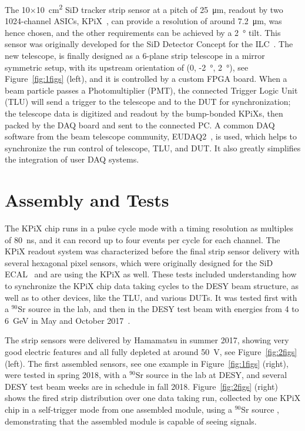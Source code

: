 The 10$\times$\SI{10}{\square\centi\metre} SiD tracker strip sensor at a pitch of \SI{25}{\micro\metre}, readout by two 1024-channel ASICs, KPiX~\cite{kpix}, can provide a resolution of around \SI{7.2}{\micro\metre},
was hence chosen, and the other requirements can be achieved by a \SI{2}{\degree} tilt. This sensor was originally developed for the SiD Detector Concept for the ILC~\cite{Behnke:2013lya}.
The new telescope, \lycoris is finally designed as a 6-plane strip telescope in a mirror symmetric setup, with its upstream orientation of (0, -\SI{2}{\degree}, \SI{2}{\degree}),
see Figure~\ref{fig:1figs} (left), and it is controlled by a custom FPGA board.
When a beam particle passes a Photomultiplier (PMT), the connected Trigger Logic Unit (TLU) will send a trigger to the telescope and to the DUT for synchronization;
the telescope data is digitized and readout by the bump-bonded KPiXs, then packed by the DAQ board and sent to the connected PC. A common DAQ software from the beam telescope
community, EUDAQ2~\cite{eudaq2}, is used, which helps to synchronize the run control of telescope, TLU, and DUT. It also greatly simplifies the integration of user DAQ systems.

\section*{Assembly and Tests}

The KPiX chip runs in a pulse cycle mode with a timing resolution as multiples of \SI{80}{\nano\second}, and it can record up to four events per cycle for each channel.
The KPiX readout system was characterized before the final strip sensor delivery with several hexagonal pixel sensors, which were originally designed for the SiD ECAL~\cite{Behnke:2013lya}
and are using the KPiX as well. These tests included understanding how to synchronize the KPiX chip data taking cycles to the DESY beam structure, as well as to other devices, like the TLU, and various DUTs.
It was tested first with a $^{90}$Sr source in the lab, and then in the DESY test beam with energies from 4 to \SI{6}{\GeV} in May and October 2017~\cite{lycoris1}.

The strip sensors were delivered by Hamamatsu in summer 2017, showing very good electric features and all fully depleted at around \SI{50}{\volt}, see Figure~\ref{fig:2figs} (left).
The first assembled sensors, see one example in Figure~\ref{fig:1figs} (right), were tested in spring 2018, with a $^{90}$Sr source in the lab at DESY, and several DESY test beam weeks are in schedule in fall 2018.
Figure~\ref{fig:2figs} (right) shows the fired strip distribution over one data taking run, collected by one KPiX chip in a self-trigger mode from one assembled module, using a $^{90}$Sr source ,
demonstrating that the assembled module is capable of seeing signals.


